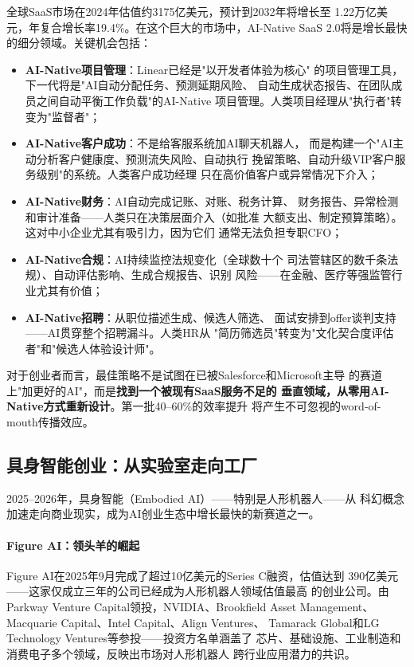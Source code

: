 全球SaaS市场在2024年估值约3175亿美元，预计到2032年将增长至
1.22万亿美元，年复合增长率19.4\%。在这个巨大的市场中，AI-Native
SaaS 2.0将是增长最快的细分领域。关键机会包括：

\begin{itemize}
  \item \textbf{AI-Native项目管理}：Linear已经是"以开发者体验为核心"
    的项目管理工具，下一代将是"AI自动分配任务、预测延期风险、
    自动生成状态报告、在团队成员之间自动平衡工作负载"的AI-Native
    项目管理。人类项目经理从"执行者"转变为"监督者"；
  \item \textbf{AI-Native客户成功}：不是给客服系统加AI聊天机器人，
    而是构建一个"AI主动分析客户健康度、预测流失风险、自动执行
    挽留策略、自动升级VIP客户服务级别"的系统。人类客户成功经理
    只在高价值客户或异常情况下介入；
  \item \textbf{AI-Native财务}：AI自动完成记账、对账、税务计算、
    财务报告、异常检测和审计准备——人类只在决策层面介入（如批准
    大额支出、制定预算策略）。这对中小企业尤其有吸引力，因为它们
    通常无法负担专职CFO；
  \item \textbf{AI-Native合规}：AI持续监控法规变化（全球数十个
    司法管辖区的数千条法规）、自动评估影响、生成合规报告、识别
    风险——在金融、医疗等强监管行业尤其有价值；
  \item \textbf{AI-Native招聘}：从职位描述生成、候选人筛选、
    面试安排到offer谈判支持——AI贯穿整个招聘漏斗。人类HR从
    "简历筛选员"转变为"文化契合度评估者"和"候选人体验设计师"。
\end{itemize}

对于创业者而言，最佳策略不是试图在已被Salesforce和Microsoft主导
的赛道上"加更好的AI"，而是\textbf{找到一个被现有SaaS服务不足的
垂直领域，从零用AI-Native方式重新设计}。第一批40--60\%的效率提升
将产生不可忽视的word-of-mouth传播效应。


\subsection{具身智能创业：从实验室走向工厂}
\label{subsec:outlook-embodied-ai}

2025--2026年，具身智能（Embodied AI）——特别是人形机器人——从
科幻概念加速走向商业现实，成为AI创业生态中增长最快的新赛道之一。

\paragraph{Figure AI：领头羊的崛起}
Figure AI在2025年9月完成了超过10亿美元的Series C融资，估值达到
390亿美元——这家仅成立三年的公司已经成为人形机器人领域估值最高
的创业公司。由Parkway Venture Capital领投，NVIDIA、Brookfield
Asset Management、Macquarie Capital、Intel Capital、Align Ventures、
Tamarack Global和LG Technology Ventures等参投——投资方名单涵盖了
芯片、基础设施、工业制造和消费电子多个领域，反映出市场对人形机器人
跨行业应用潜力的共识。

